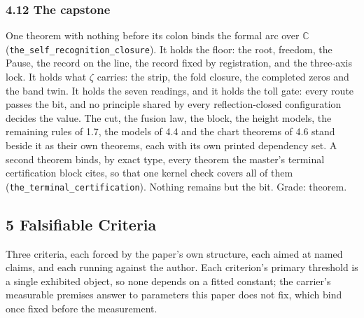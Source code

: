 \documentclass[10pt]{article}
\begin{document}
\hypertarget{the-capstone}{%
\subsubsection{4.12 The capstone}\label{the-capstone}}

One theorem with nothing before its colon binds the formal arc over
\(\mathbb{C}\)
(\texttt{the\_\allowbreak{}self\_\allowbreak{}recognition\_\allowbreak{}closure}).
It holds the floor: the root, freedom, the Pause, the record on the
line, the record fixed by registration, and the three-axis lock. It
holds what \(\zeta\) carries: the strip, the fold closure, the completed
zeros and the band twin. It holds the seven readings, and it holds the
toll gate: every route passes the bit, and no principle shared by every
reflection-closed configuration decides the value. The cut, the fusion
law, the block, the height models, the remaining rules of 1.7, the
models of 4.4 and the chart theorems of 4.6 stand beside it as their own
theorems, each with its own printed dependency set. A second theorem
binds, by exact type, every theorem the master's terminal certification
block cites, so that one kernel check covers all of them
(\texttt{the\_\allowbreak{}terminal\_\allowbreak{}certification}).
Nothing remains but the bit. Grade: theorem.

\hypertarget{falsifiable-criteria}{%
\subsection{5 Falsifiable Criteria}\label{falsifiable-criteria}}

Three criteria, each forced by the paper's own structure, each aimed at
named claims, and each running against the author. Each criterion's
primary threshold is a single exhibited object, so none depends on a
fitted constant; the carrier's measurable premises answer to parameters
this paper does not fix, which bind once fixed before the measurement.
\end{document}
